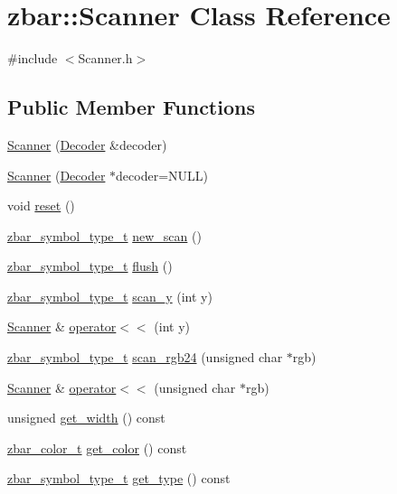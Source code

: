 \hypertarget{classzbar_1_1_scanner}{
\section{zbar::Scanner Class Reference}
\label{classzbar_1_1_scanner}
}


{\ttfamily \#include $<$Scanner.h$>$}

\subsection*{Public Member Functions}
\begin{DoxyCompactItemize}
\item 
\hyperlink{classzbar_1_1_scanner_aa032c21c0f9672b30997ae7bfaed9986}{Scanner} (\hyperlink{classzbar_1_1_decoder}{Decoder} \&decoder)
\item 
\hyperlink{classzbar_1_1_scanner_a8e648fc2200fb52da3945d6f65ee0605}{Scanner} (\hyperlink{classzbar_1_1_decoder}{Decoder} $\ast$decoder=NULL)
\item 
void \hyperlink{classzbar_1_1_scanner_a826d416db31eb6e2d7666348f002eec7}{reset} ()
\item 
\hyperlink{zbar_8h_a74c1318b082084bdeaa7333b355f3e64}{zbar\_\-symbol\_\-type\_\-t} \hyperlink{classzbar_1_1_scanner_ac970903fc0705856805826e32f2c9ceb}{new\_\-scan} ()
\item 
\hyperlink{zbar_8h_a74c1318b082084bdeaa7333b355f3e64}{zbar\_\-symbol\_\-type\_\-t} \hyperlink{classzbar_1_1_scanner_aac5cd86e3e6729999a79a2f37d7bac46}{flush} ()
\item 
\hyperlink{zbar_8h_a74c1318b082084bdeaa7333b355f3e64}{zbar\_\-symbol\_\-type\_\-t} \hyperlink{classzbar_1_1_scanner_aaa64b8b7a432cec3242ec2f1ce890a7e}{scan\_\-y} (int y)
\item 
\hyperlink{classzbar_1_1_scanner}{Scanner} \& \hyperlink{classzbar_1_1_scanner_aca347395583ab0574b839a3d39aaee76}{operator$<$$<$} (int y)
\item 
\hyperlink{zbar_8h_a74c1318b082084bdeaa7333b355f3e64}{zbar\_\-symbol\_\-type\_\-t} \hyperlink{classzbar_1_1_scanner_a164bdd0f0b919d941a25cd93e110b819}{scan\_\-rgb24} (unsigned char $\ast$rgb)
\item 
\hyperlink{classzbar_1_1_scanner}{Scanner} \& \hyperlink{classzbar_1_1_scanner_ade8dbea2df62c3678de98b1e2b877f60}{operator$<$$<$} (unsigned char $\ast$rgb)
\item 
unsigned \hyperlink{classzbar_1_1_scanner_a096ff8d56319d747f047f72e452c2dea}{get\_\-width} () const 
\item 
\hyperlink{zbar_8h_a97403e410d54474d33757e6544fd2377}{zbar\_\-color\_\-t} \hyperlink{classzbar_1_1_scanner_a8e6f4eb0deeef3525d864a5e20972eb2}{get\_\-color} () const 
\item 
\hypertarget{classzbar_1_1_scanner_a5addf7e99d18171bccac347338920353}{
\hyperlink{zbar_8h_a74c1318b082084bdeaa7333b355f3e64}{zbar\_\-symbol\_\-type\_\-t} \hyperlink{classzbar_1_1_scanner_a5addf7e99d18171bccac347338920353}{get\_\-type} () const }
\label{classzbar_1_1_scanner_a5addf7e99d18171bccac347338920353}


\end{DoxyCompactItemize}
